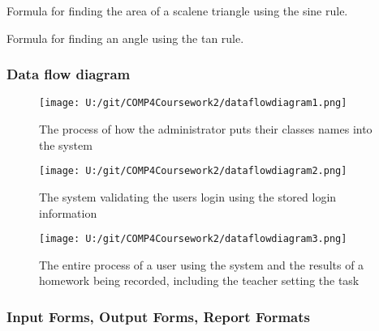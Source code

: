 \begin{algorithm}[H]
\caption{Formula for finding the area of a scalene triangle using the sine rule.}
\begin{algorithmic}[1]
\Else{}
\EndIf
\end{algorithmic}
\end{algorithm}

\begin{algorithm}[H]
\caption{Formula for finding an angle using the tan rule.}
\begin{algorithmic}[1]
\Else{}
\EndIf
\end{algorithmic}
\end{algorithm}

\subsubsection{Data flow diagram}

\begin{figure}[H]
    \texttt{[image: U:/git/COMP4Coursework2/dataflowdiagram1.png]}
    \caption{The process of how the administrator puts their classes names into the system} \label{fig:print_function_result}
\end{figure}

\begin{figure}[H]
    \texttt{[image: U:/git/COMP4Coursework2/dataflowdiagram2.png]}
    \caption{The system validating the users login using the stored login information} \label{fig:print_function_result}
\end{figure}

\begin{figure}[H]
    \texttt{[image: U:/git/COMP4Coursework2/dataflowdiagram3.png]}
    \caption{The entire process of a user using the system and the results of a homework being recorded, including the teacher setting the task} \label{fig:print_function_result}
\end{figure}

\subsubsection{Input Forms, Output Forms, Report Formats}

